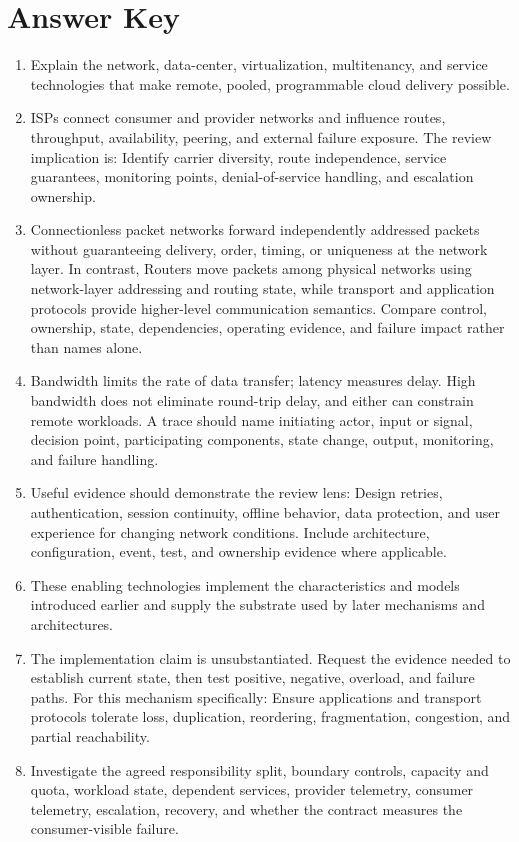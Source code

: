\documentclass[11pt]{article}
\begin{document}
\section{Answer Key}
\begin{enumerate}
\item Explain the network, data-center, virtualization, multitenancy, and service technologies that make remote, pooled, programmable cloud delivery possible.
\item ISPs connect consumer and provider networks and influence routes, throughput, availability, peering, and external failure exposure. The review implication is: Identify carrier diversity, route independence, service guarantees, monitoring points, denial-of-service handling, and escalation ownership.
\item Connectionless packet networks forward independently addressed packets without guaranteeing delivery, order, timing, or uniqueness at the network layer. In contrast, Routers move packets among physical networks using network-layer addressing and routing state, while transport and application protocols provide higher-level communication semantics. Compare control, ownership, state, dependencies, operating evidence, and failure impact rather than names alone.
\item Bandwidth limits the rate of data transfer; latency measures delay. High bandwidth does not eliminate round-trip delay, and either can constrain remote workloads. A trace should name initiating actor, input or signal, decision point, participating components, state change, output, monitoring, and failure handling.
\item Useful evidence should demonstrate the review lens: Design retries, authentication, session continuity, offline behavior, data protection, and user experience for changing network conditions. Include architecture, configuration, event, test, and ownership evidence where applicable.
\item These enabling technologies implement the characteristics and models introduced earlier and supply the substrate used by later mechanisms and architectures.
\item The implementation claim is unsubstantiated. Request the evidence needed to establish current state, then test positive, negative, overload, and failure paths. For this mechanism specifically: Ensure applications and transport protocols tolerate loss, duplication, reordering, fragmentation, congestion, and partial reachability.
\item Investigate the agreed responsibility split, boundary controls, capacity and quota, workload state, dependent services, provider telemetry, consumer telemetry, escalation, recovery, and whether the contract measures the consumer-visible failure.

\end{enumerate}
\end{document}
